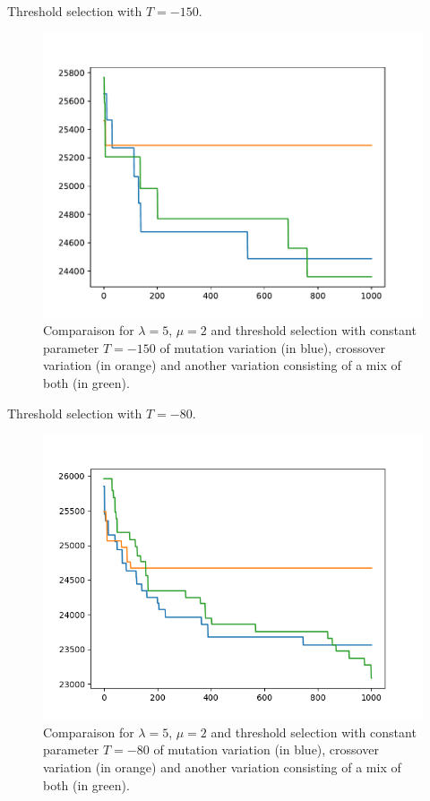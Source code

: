 \documentclass{beamer}
\begin{document}
\begin{frame}
	Threshold selection with $T = -150$.
\begin{figure}
\centering
\includegraphics[scale=.5]{../Plots/new/5,2,mutcmul,threshold-150.pdf}
\caption{Comparaison for $\lambda = 5$, $\mu = 2$ and threshold selection with
constant parameter $T = -150$ of mutation variation (in blue), crossover
variation (in orange) and another variation consisting of a mix of both (in
green).}
\label{Thresholdcomparevariation}
\end{figure}
\end{frame}

\begin{frame}
	Threshold selection with $T = -80$.
\begin{figure}
\centering
\includegraphics[scale=.5]{../Plots/new/5,2,mutcmul,Threshold-80.png}
\caption{Comparaison for $\lambda = 5$, $\mu = 2$ and threshold selection with
constant parameter $T = -80$ of mutation variation (in blue), crossover
variation (in orange) and another variation consisting of a mix of both (in
green).}
\label{Threshold-80comparevariation}
\end{figure}
\end{frame}
\end{document}
